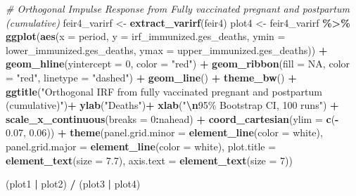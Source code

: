 \documentclass[
]{article}
\newenvironment{Shaded}{\begin{snugshade}}{\end{snugshade}}
\newcommand{\AttributeTok}[1]{\textcolor[rgb]{0.13,0.29,0.53}{#1}}
\newcommand{\CommentTok}[1]{\textcolor[rgb]{0.56,0.35,0.01}{\textit{#1}}}
\newcommand{\ConstantTok}[1]{\textcolor[rgb]{0.56,0.35,0.01}{#1}}
\newcommand{\DecValTok}[1]{\textcolor[rgb]{0.00,0.00,0.81}{#1}}
\newcommand{\FloatTok}[1]{\textcolor[rgb]{0.00,0.00,0.81}{#1}}
\newcommand{\FunctionTok}[1]{\textcolor[rgb]{0.13,0.29,0.53}{\textbf{#1}}}
\newcommand{\NormalTok}[1]{#1}
\newcommand{\OtherTok}[1]{\textcolor[rgb]{0.56,0.35,0.01}{#1}}
\newcommand{\SpecialCharTok}[1]{\textcolor[rgb]{0.81,0.36,0.00}{\textbf{#1}}}
\newcommand{\StringTok}[1]{\textcolor[rgb]{0.31,0.60,0.02}{#1}}
\renewenvironment{Shaded}{\begin{mdframed}[ backgroundcolor=shadecolor, linecolor = shadecolor, leftmargin=\dimexpr\leftmargin-2pt\relax, innerleftmargin=1.6pt, innertopmargin=5pt, skipabove=10pt,skipbelow=3pt ]}{\end{mdframed}}
\begin{document}
\begin{Shaded}
\begin{Highlighting}[]
\CommentTok{\# Orthogonal Impulse Response from Fully vaccinated pregnant and postpartum (cumulative)}
\NormalTok{feir4\_varirf }\OtherTok{\textless{}{-}} \FunctionTok{extract\_varirf}\NormalTok{(feir4)}
\NormalTok{plot4 }\OtherTok{\textless{}{-}}\NormalTok{ feir4\_varirf }\SpecialCharTok{\%\textgreater{}\%} 
  \FunctionTok{ggplot}\NormalTok{(}\FunctionTok{aes}\NormalTok{(}\AttributeTok{x =}\NormalTok{ period, }
             \AttributeTok{y =}\NormalTok{ irf\_immunized.ges\_deaths, }
             \AttributeTok{ymin =}\NormalTok{ lower\_immunized.ges\_deaths, }
             \AttributeTok{ymax =}\NormalTok{ upper\_immunized.ges\_deaths)) }\SpecialCharTok{+}
  \FunctionTok{geom\_hline}\NormalTok{(}\AttributeTok{yintercept =} \DecValTok{0}\NormalTok{, }\AttributeTok{color =} \StringTok{"red"}\NormalTok{) }\SpecialCharTok{+}
  \FunctionTok{geom\_ribbon}\NormalTok{(}\AttributeTok{fill =} \ConstantTok{NA}\NormalTok{, }
              \AttributeTok{color =} \StringTok{"red"}\NormalTok{,}
              \AttributeTok{linetype =} \StringTok{"dashed"}\NormalTok{) }\SpecialCharTok{+}
  \FunctionTok{geom\_line}\NormalTok{() }\SpecialCharTok{+}
  \FunctionTok{theme\_bw}\NormalTok{() }\SpecialCharTok{+}
  \FunctionTok{ggtitle}\NormalTok{(}\StringTok{"Orthogonal IRF from fully vaccinated pregnant and postpartum (cumulative)"}\NormalTok{)}\SpecialCharTok{+}
  \FunctionTok{ylab}\NormalTok{(}\StringTok{"Deaths"}\NormalTok{)}\SpecialCharTok{+}
  \FunctionTok{xlab}\NormalTok{(}\StringTok{"}\SpecialCharTok{\textbackslash{}n}\StringTok{95\% Bootstrap CI, 100 runs"}\NormalTok{) }\SpecialCharTok{+} 
  \FunctionTok{scale\_x\_continuous}\NormalTok{(}\AttributeTok{breaks =} \DecValTok{0}\SpecialCharTok{:}\NormalTok{nahead) }\SpecialCharTok{+}
  \FunctionTok{coord\_cartesian}\NormalTok{(}\AttributeTok{ylim =} \FunctionTok{c}\NormalTok{(}\SpecialCharTok{{-}} \FloatTok{0.07}\NormalTok{, }\FloatTok{0.06}\NormalTok{)) }\SpecialCharTok{+}
  \FunctionTok{theme}\NormalTok{(}\AttributeTok{panel.grid.minor =} \FunctionTok{element\_line}\NormalTok{(}\AttributeTok{color =} \StringTok{\textquotesingle{}white\textquotesingle{}}\NormalTok{),}
        \AttributeTok{panel.grid.major =} \FunctionTok{element\_line}\NormalTok{(}\AttributeTok{color =} \StringTok{\textquotesingle{}white\textquotesingle{}}\NormalTok{),}
        \AttributeTok{plot.title =} \FunctionTok{element\_text}\NormalTok{(}\AttributeTok{size =} \FloatTok{7.7}\NormalTok{),}
        \AttributeTok{axis.text =} \FunctionTok{element\_text}\NormalTok{(}\AttributeTok{size =} \DecValTok{7}\NormalTok{))}

\NormalTok{(plot1 }\SpecialCharTok{|}\NormalTok{ plot2) }\SpecialCharTok{/}\NormalTok{ (plot3 }\SpecialCharTok{|}\NormalTok{ plot4)}
\end{Highlighting}
\end{Shaded}
\end{document}

